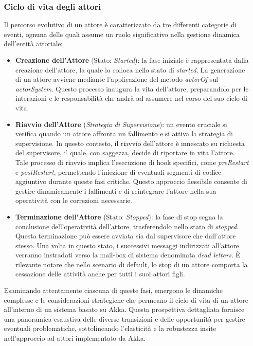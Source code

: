 \subsubsection[Ciclo di vita]{Ciclo di vita degli attori}
Il percorso evolutivo di un attore è caratterizzato da tre differenti categorie di eventi, ognuna delle quali assume un ruolo significativo nella gestione dinamica dell'entità attoriale:
\begin{itemize}
  \item \textbf{Creazione dell'Attore} (Stato: \textit{Started}): la fase iniziale è rappresentata dalla creazione dell'attore, la quale lo colloca nello stato di \textit{started}.
  La generazione di un attore avviene mediante l'applicazione del metodo \textit{actorOf} sul \textit{actorSystem}.
  Questo processo inaugura la vita dell'attore, preparandolo per le interazioni e le responsabilità che andrà ad assumere nel corso del suo ciclo di vita.
  \item \textbf{Riavvio dell'Attore} (\textit{Strategia di Supervisione}): un evento cruciale si verifica quando un attore affronta un fallimento e si attiva la strategia di supervisione.
  In questo contesto, il riavvio dell'attore è innescato su richiesta del supervisore, il quale, con saggezza, decide di riportare in vita l'attore.
  Tale processo di riavvio implica l'esecuzione di hook specifici, come \textit{preRestart} e \textit{postRestart}, permettendo l'iniezione di eventuali segmenti di codice aggiuntivo durante queste fasi critiche.
  Questo approccio flessibile consente di gestire dinamicamente i fallimenti e di reintegrare l'attore nella sua operatività con le correzioni necessarie.
  \item \textbf{Terminazione dell'Attore} (Stato: \textit{Stopped}): la fase di stop segna la conclusione dell'operatività dell'attore, trasferendolo nello stato di \textit{stopped}.
  Questa terminazione può essere avviata sia dal supervisore che dall'attore stesso.
  Una volta in questo stato, i successivi messaggi indirizzati all'attore verranno instradati verso la mail-box di sistema denominata \textit{dead letters}.
  È rilevante notare che nello scenario di default, lo stop di un attore comporta la cessazione delle attività anche per tutti i suoi attori figli.
\end{itemize}
Esaminando attentamente ciascuna di queste fasi, emergono le dinamiche complesse e le considerazioni strategiche che permeano il ciclo di vita di un attore all'interno di un sistema basato su Akka.
Questa prospettiva dettagliata fornisce una panoramica esaustiva delle diverse transizioni e delle opportunità per gestire eventuali problematiche, sottolineando l'elasticità e la robustezza insite nell'approccio ad attori implementato da Akka.

